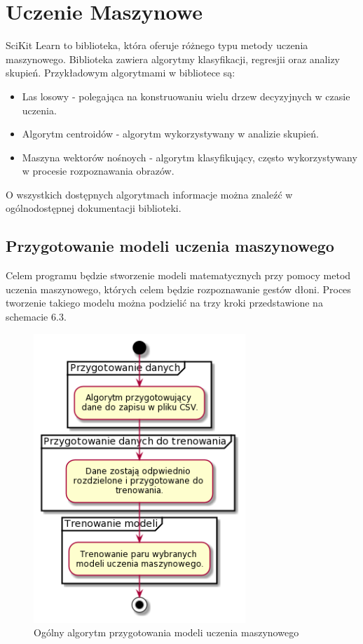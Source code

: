     
    
    \section{Uczenie Maszynowe}
    
    \quad SciKit Learn to biblioteka, która oferuje różnego typu metody uczenia maszynowego. Biblioteka zawiera algorytmy klasyfikacji, regresjii oraz analizy skupień. Przykładowym algorytmami w bibliotece są:
    \begin{itemize}
        \item Las losowy - polegająca na konstruowaniu wielu drzew decyzyjnych w czasie uczenia. 
        \item Algorytm centroidów - algorytm wykorzystywany w analizie skupień.
        \item Maszyna wektorów nośnoych - algorytm klasyfikujący, często wykorzystywany w procesie rozpoznawania obrazów. 
    \end{itemize}
    O wszystkich dostępnych algorytmach informacje można znaleźć w ogólnodostępnej dokumentacji biblioteki. 
    
    \subsection{Przygotowanie modeli uczenia maszynowego}
    \quad Celem programu będzie stworzenie modeli matematycznych przy pomocy metod uczenia maszynowego, których celem będzie rozpoznawanie gestów dłoni. Proces tworzenie takiego modelu można podzielić na trzy kroki przedstawione na schemacie 6.3. 

    \begin{figure}[H]
        \begin{center}
            \includegraphics[width=8cm]{../images/full_algorithm.png}
            \caption{Ogólny algorytm przygotowania modeli uczenia maszynowego}
        \end{center}
    \end{figure}

